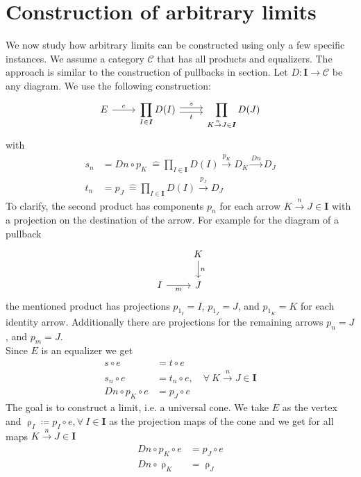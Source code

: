 \section{Construction of arbitrary limits}
We now study how arbitrary limits can be constructed using only a
few specific instances.
We assume a category $\mathscr C$ that has all products and equalizers.
The approach is similar to the construction of pullbacks in section.
Let $D : \bm I \to \mathscr C$ be any diagram.
We use the following construction:
\[
  \begin{tikzcd}
    E \arrow{r}{e} &
    \displaystyle \prod_{I \in \bm{I}} D(I)
    \arrow[r,shift left, "s"] \arrow[r,shift right,swap,"t"] &
    \displaystyle \prod_{K \overset{n}{\to} J \in \bm{I}} D(J)
  \end{tikzcd}
\]
with
\begin{align*}
  s_n &= Dn \circ p_K\ \hat{=} \prod_{I \in \bm{I}} D(I)
        \overset{p_K}{\rightarrow} D_K \overset{Dn}{\rightarrow} D_J \\
  t_n &= p_J\ \hat{=} \prod_{I \in \bm{I}} D(I)
        \overset{p_J}{\rightarrow} D_J
\end{align*}
To clarify, the second product has components $p_n$ for each arrow
$K \overset{n}{\to} J \in \bm{I}$ with a projection on
the destination of the arrow.
For example for the diagram of a pullback
\[
  \begin{tikzcd}
    & K \arrow{d}{n} \\
    I \arrow[swap]{r}{m} & J
  \end{tikzcd}
\]
the mentioned product has projections $p_{1_I} = I$, $p_{1_J} = J$, and $p_{1_K} = K$
for each identity arrow.
Additionally there are projections for the remaining arrows $p_n = J$, and $p_m = J$.\\
Since $E$ is an equalizer we get
\begin{align*}
  s \circ e &= t \circ e\\
  s_n \circ e &= t_n \circ e, \quad \forall\ K \overset{n}{\rightarrow} J \in \bm I \\
  Dn \circ p_K \circ e &= p_J \circ e
\end{align*}
The goal is to construct a limit, i.e. a universal cone.
We take $E$ as the vertex and
$\uprho_I \coloneqq p_I \circ e, \forall\ I \in \bm I$
as the projection maps of the cone and we get
for all maps $K \overset{n}{\rightarrow} J \in \bm I$
\begin{align*}
  Dn \circ p_K \circ e &= p_J \circ e \\
  Dn \circ \uprho_K &= \uprho_J
\end{align*}
